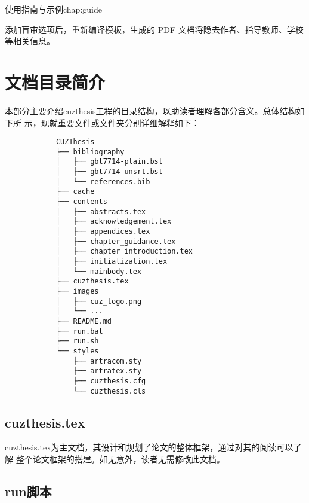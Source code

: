 \begin{cuzchapter}{使用指南与示例}{chap:guide}
\begin{listing}[htbp]
    \end{listing}

    添加盲审选项后，重新编译模板，生成的 PDF 文档将隐去作者、指导教师、学校等相关信息。

    \section{文档目录简介}\label{sec:directory}

    本部分主要介绍cuzthesis工程的目录结构，以助读者理解各部分含义。总体结构如下所
    示，现就重要文件或文件夹分别详细解释如下：

    \begingroup
    \small\linespread{1}
    \begin{center}
        \begin{verbatim}
            CUZThesis
            ├── bibliography
            │   ├── gbt7714-plain.bst
            │   ├── gbt7714-unsrt.bst
            │   └── references.bib
            ├── cache
            ├── contents
            │   ├── abstracts.tex
            │   ├── acknowledgement.tex
            │   ├── appendices.tex
            │   ├── chapter_guidance.tex
            │   ├── chapter_introduction.tex
            │   ├── initialization.tex
            │   └── mainbody.tex
            ├── cuzthesis.tex
            ├── images
            │   ├── cuz_logo.png
            │   └── ...
            ├── README.md
            ├── run.bat
            ├── run.sh
            └── styles
                ├── artracom.sty
                ├── artratex.sty
                ├── cuzthesis.cfg
                └── cuzthesis.cls
        \end{verbatim}
    \end{center}
    \endgroup

    \subsection{cuzthesis.tex}\label{sub:cuzthesis}

    cuzthesis.tex为主文档，其设计和规划了论文的整体框架，通过对其的阅读可以了解
    整个论文框架的搭建。如无意外，读者无需修改此文档。

    \subsection{run脚本}\label{sub:scripts}


\end{cuzchapter}
